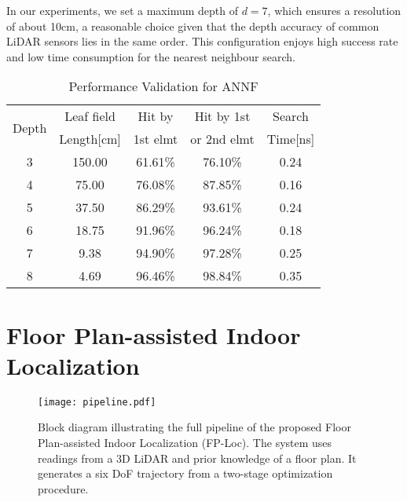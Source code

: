 \documentclass[letterpaper, 10 pt, conference]{ieeeconf}  %
\begin{document}
In our experiments, we set a maximum depth of $d = 7$, which ensures a resolution of about 10cm, a reasonable choice given that the depth accuracy of common LiDAR sensors lies in the same order. This configuration enjoys high success rate and low time consumption for the nearest neighbour search.

\begin{table}[t]
  \caption{Performance Validation for ANNF}
  \label{ANNF_Validation}
  \begin{center}
  \begin{tabular}{ccccc}
    \toprule
    \multirow{2}{*}{Depth} & Leaf field & Hit by   & Hit by 1st  & Search   \\
                           & Length[cm] & 1st elmt & or 2nd elmt & Time[ns] \\
    \midrule
    3 & 150.00 & 61.61\% & 76.10\% & 0.24 \\
    4 & 75.00 & 76.08\% & 87.85\% & 0.16 \\
    5 & 37.50 & 86.29\% & 93.61\% & 0.24 \\
    6 & 18.75 & 91.96\% & 96.24\% & 0.18 \\
    7 &  9.38 & 94.90\% & 97.28\% & 0.25 \\
    8 &  4.69 & 96.46\% & 98.84\% & 0.35 \\
    \bottomrule
  \end{tabular}
  \end{center}
\end{table}


\section{Floor Plan-assisted Indoor Localization}

\begin{figure}[t]
  \centering
  \texttt{[image: pipeline.pdf]}
  \caption{Block diagram illustrating the full pipeline of the proposed Floor Plan-assisted Indoor Localization (FP-Loc). The system uses readings from a 3D LiDAR and prior knowledge of a floor plan. It generates a six DoF trajectory from a two-stage optimization procedure.}
  \label{pipeline}
\end{figure}
\end{document}

